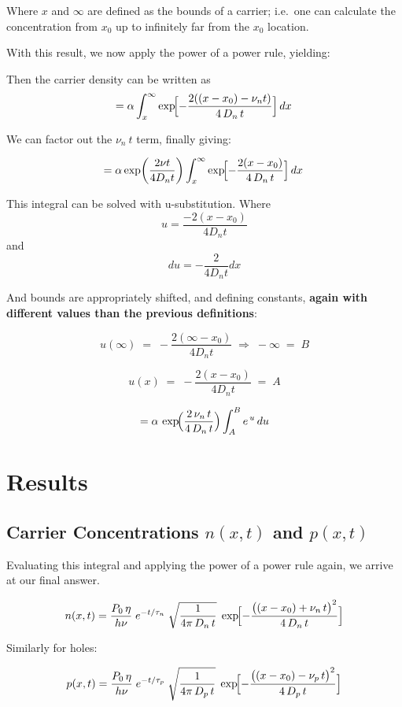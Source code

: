 \documentclass[
  journal,
]{IEEEtran}%
\begin{document}
Where \(x\) and \(\infty\) are defined as the bounds of a carrier;
i.e.~one can calculate the concentration from \(x_0\) up to infinitely
far from the \(x_0\) location.

With this result, we now apply the power of a power rule, yielding:

Then the carrier density can be written as \[
= \alpha
\int_{x}^{\infty}
\exp\!\Bigl[-\frac{2((x - x_0)- \nu_n t)}{4\,D_n\,t}\Bigr]
\,dx\,
\]

We can factor out the \(\nu_n\ t\) term, finally giving:

\[
= \alpha \exp(\frac{2\nu t}{4D_{n}t})
\int_{x}^{\infty}
\exp\!\Bigl[-\frac{2(x - x_0)}{4\,D_n\,t}\Bigr]
\,dx\,
\]

This integral can be solved with u-substitution. Where \[
u = \frac{-2(x-x_{0})}{4D_{n}t}
\] and \[
du = -\frac{2}{4D_{n}t}dx
\]

And bounds are appropriately shifted, and defining constants,
\textbf{again with different values than the previous definitions}:

\[
u(\infty) \;=\; -\frac{2(\infty - x_0)}{4D_n t}
\;\Longrightarrow\;
-\infty \;=\; B
\]

\[
u(x) \;=\; -\frac{2(x - x_0)}{4D_n t}
\;=\; A
\]

\[
= \alpha \,
  \exp\!\Bigl(\frac{2\,\nu_n\,t}{4\,D_n\,t}\Bigr)
  \int_{A}^{B} e^{\,u}\,du
\]

\section{Results}\label{results}

\subsection{\texorpdfstring{Carrier Concentrations \(n(x,t)\) and
\(p(x,t)\)}{Carrier Concentrations n(x,t) and p(x,t)}}\label{carrier-concentrations-nxt-and-pxt}

Evaluating this integral and applying the power of a power rule again,
we arrive at our final answer.

\[
n(x,t)
= \frac{P_{0}\,\eta}{h\nu}
  \;e^{-t/\tau_{n}}
  \;\sqrt{\frac{1}{4\pi\,D_{n}\,t}}
  \;\exp\!\Bigl[-\frac{\bigl((x - x_{0}) + \nu_{n}\,t\bigr)^{2}}{4\,D_{n}\,t}\Bigr]
\]

Similarly for holes:

\[
p(x,t)
= \frac{P_{0}\,\eta}{h\nu}
  \;e^{-t/\tau_{p}}
  \;\sqrt{\frac{1}{4\pi\,D_{p}\,t}}
  \;\exp\!\Bigl[-\frac{\bigl((x - x_{0}) - \nu_{p}\,t\bigr)^{2}}{4\,D_{p}\,t}\Bigr]
\]
\end{document}
